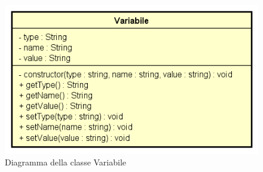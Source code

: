\begin{figure}[h!]
	\centering
	\includegraphics[scale=0.8]{res/sections/SpecificaFrontEnd/Services/Disegnetti/variabile.png}
	\caption{Diagramma della classe Variabile}
\end{figure}

